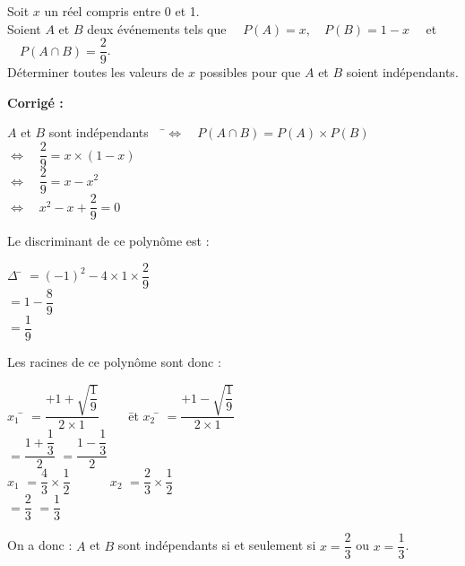 \documentclass[a4paper,11pt,exos]{nsi} %
\begin{document}
\exo{}
Soit $x$ un réel compris entre 0 et 1.\\
Soient $A$ et $B$ deux événements tels que $\quad P(A)=x, \quad P(B)=1-x\quad$ et $\quad P(A \cap B)=\dfrac{2}{9}$.\\[.5em]
Déterminer toutes les valeurs de $x$ possibles pour que $A$ et $B$ soient indépendants.\\

\textcolor{UGLiBlue}{
    \textbf{Corrigé :}
    \begin{tabbing}
        $A$ et $B$ sont indépendants$\quad$ \=$\iff\quad P(A \cap B)=P(A) \times P(B)$\\
        \>  $\iff\quad \dfrac{2}{9}=x \times (1-x)$\\[.5em]
        \>  $\iff\quad \dfrac{2}{9}=x-x^2$\\[.5em]
        \>  $\iff\quad x^2-x+\dfrac{2}{9}=0$
    \end{tabbing}
    Le discriminant de ce polynôme est :
    \begin{tabbing}
        $\Delta$ \= $=(-1)^2-4\times 1\times \dfrac{2}{9}$\\
        \> $=1-\dfrac{8}{9}$\\
        \> $=\dfrac{1}{9}$
    \end{tabbing} 
    Les racines de ce polynôme sont donc :
    \begin{tabbing}
        $x_1$ \= $=\dfrac{+1+\sqrt{\dfrac{1}{9}}}{2\times 1}\qquad$ \= et \qquad $x_2$ \= $=\dfrac{+1-\sqrt{\dfrac{1}{9}}}{2\times 1}$\\[.5em]
        \> $=\dfrac{1+\dfrac{1}{3}}{2}$ \> \> $=\dfrac{1-\dfrac{1}{3}}{2}$\\[.5em]
        $x_1$\> $=\dfrac{4}{3}\times \dfrac{1}{2}$ \> $\phantom{et }\qquad x_2$\> $=\dfrac{2}{3}\times \dfrac{1}{2}$\\[.5em]
        \> $=\dfrac{2}{3}$ \> \> $=\dfrac{1}{3}$
    \end{tabbing}
    On a donc : $A$ et $B$ sont indépendants si et seulement si $x=\dfrac{2}{3}$ ou $x=\dfrac{1}{3}$.
}
\end{document}
